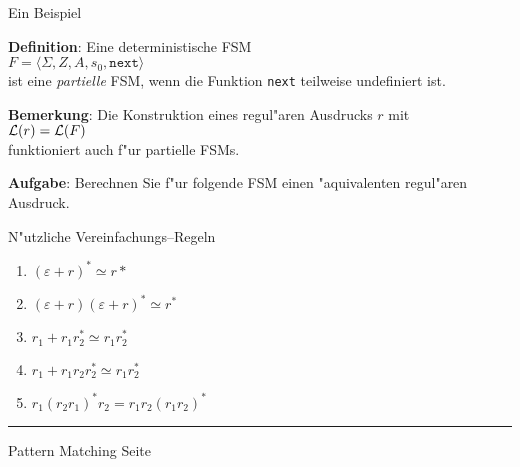 \begin{slide}{}
\normalsize

\begin{center}
Ein Beispiel 
\end{center}
\vspace*{0.5cm}

\footnotesize
\textbf{Definition}: Eine deterministische FSM \\[0.3cm]
\hspace*{1.3cm} $F = \langle \Sigma, Z, A, s_0, \mathtt{next}  \rangle$  \\[0.3cm]
ist eine \emph{partielle} FSM, wenn die Funktion \texttt{next} teilweise undefiniert ist.

\textbf{Bemerkung}: Die Konstruktion eines regul"aren Ausdrucks $r$ mit \\[0.3cm]
\hspace*{1.3cm} ${\cal L}(r) = {\cal L}(F)$ \\[0.3cm]
funktioniert auch f"ur partielle FSMs.
\vspace*{0.5cm}

\textbf{Aufgabe}: Berechnen Sie f"ur folgende FSM einen "aquivalenten regul"aren Ausdruck. \\[0.6cm]
\hspace*{1.3cm} 

N"utzliche Vereinfachungs--Regeln
\begin{enumerate}
\item $(\varepsilon + r)^* \simeq r*$
\item $(\varepsilon + r) (\varepsilon + r)^* \simeq r^*$
\item $r_1 + r_1 r_2^* \simeq r_1 r_2^*$
\item $r_1 + r_1 r_2 r_2^* \simeq r_1 r_2^*$
\item $r_1(r_2r_1)^*r_2 = r_1r_2(r_1r_2)^*$
\end{enumerate}

\vspace*{\fill}
\tiny \addtocounter{mypage}{1}
\rule{17cm}{1mm}
Pattern Matching \hspace*{\fill} Seite 
\end{slide}


